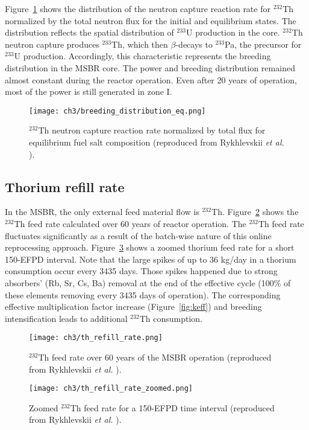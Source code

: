 Figure~\ref{fig:breeding_den} shows the distribution of the neutron capture 
reaction rate for $^{232}$Th normalized by the total neutron flux for the 
initial and equilibrium states. The distribution reflects the spatial 
distribution of $^{233}$U production in the core. $^{232}$Th neutron capture 
produces $^{233}$Th, which then $\beta$-decays to $^{233}$Pa, the precursor 
for $^{233}$U production. Accordingly, this characteristic represents the 
breeding distribution in the \gls{MSBR} core. The power and breeding 
distribution remained almost constant during the reactor operation. Even after 
20 years of operation, most of the power is still generated in zone I.
\begin{figure}[ht!] %
	\centering
	\texttt{[image: ch3/breeding\_distribution\_eq.png]} 
		\vspace{-5mm}
	\caption{$^{232}$Th neutron capture reaction rate normalized by total flux 
		for equilibrium fuel salt composition (reproduced from 
		Rykhlevskii \emph{et al.} \cite{rykhlevskii_modeling_2019}).}
	\label{fig:breeding_den}
\end{figure}
\FloatBarrier

\subsection{Thorium refill rate}
In the \gls{MSBR}, the only external feed material flow  is $^{232}$Th. 
Figure~\ref{fig:th_refill} shows the $^{232}$Th feed rate calculated over 60 
years of reactor operation. The $^{232}$Th feed rate fluctuates significantly 
as a result of the batch-wise nature of this online reprocessing approach. 
Figure~\ref{fig:th_refill_zoomed} shows a zoomed thorium feed rate for a short 
150-EFPD interval. Note that the large spikes of up to 36 kg/day in a thorium 
consumption occur every 3435 days. Those spikes happened due to strong 
absorbers' (Rb, Sr, Cs, Ba) removal at the end of the effective cycle (100\% 
of these elements removing every 3435 days of operation). The corresponding 
effective multiplication factor increase (Figure~\ref{fig:keff}) and breeding  
intensification leads to additional $^{232}$Th consumption.  
\begin{figure}[ht!] %
	\texttt{[image: ch3/th\_refill\_rate.png]} 
	\caption{$^{232}$Th feed rate over 60 years of the \gls{MSBR} operation 
	(reproduced from Rykhlevskii \emph{et al.} 
	\cite{rykhlevskii_modeling_2019}).}
	\label{fig:th_refill}
\end{figure}
\begin{figure}[ht!] %
	\texttt{[image: ch3/th\_refill\_rate\_zoomed.png]} 
	\caption{Zoomed $^{232}$Th feed rate for a 150-EFPD time interval 
	(reproduced from Rykhlevskii \emph{et al.} 
	\cite{rykhlevskii_modeling_2019}).}
	\label{fig:th_refill_zoomed}
\end{figure}

